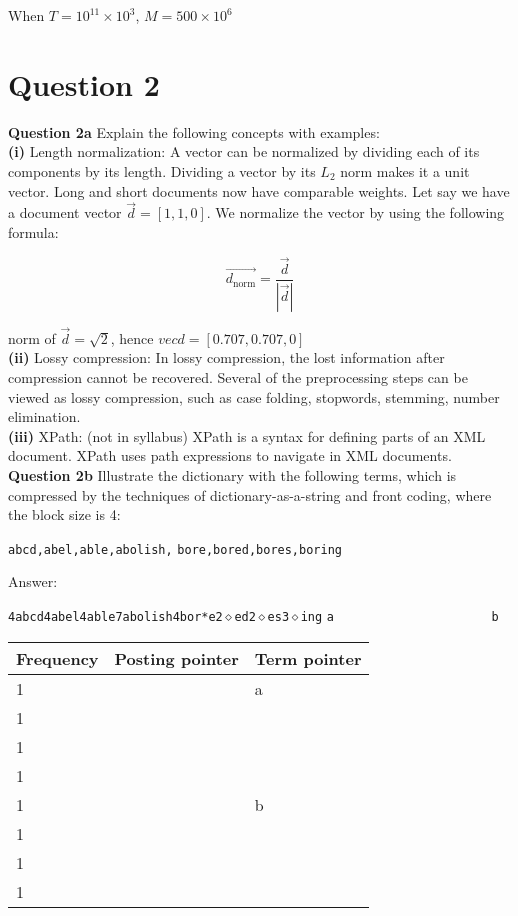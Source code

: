 \documentclass[11pt,a4paper]{report}
\begin{document}
\begin{multicols*}{2}
\noindent When $T=10^{11} \times 10^3$, $M=500 \times 10^6$

\section{Question 2}

\noindent \textbf{Question 2a} Explain the following concepts with examples:\\

\noindent \textbf{(i)} Length normalization: A vector can be normalized by dividing each of its components by its length. Dividing a vector by its $L_2$ norm makes it a unit vector. Long and short documents now have comparable weights. Let say we have a document vector $\vec{d} = [1,1,0]$. We normalize the vector by using the following formula:

$$\vec{d_{\text{norm}}} = \frac{\vec{d}}{|\vec{d}|}$$

\noindent norm of $\vec{d} = \sqrt{2}$, hence $vec{d} = [0.707, 0.707, 0]$ \\

\noindent \textbf{(ii)} Lossy compression: In lossy compression, the lost information after compression cannot be recovered. Several of the preprocessing steps can be viewed as lossy compression, such as case folding, stopwords, stemming, number elimination. \\

\noindent \textbf{(iii)} XPath: (not in syllabus) XPath is a syntax for defining parts of an XML document. XPath uses path expressions to navigate in XML documents. \\

\noindent \textbf{Question 2b} Illustrate the dictionary with the following terms, which is compressed by the techniques of dictionary-as-a-string and front coding, where the block size is 4:
\begin{center}
\verb|abcd,abel,able,abolish,|
\verb|bore,bored,bores,boring|
\end{center}

\noindent Answer:

\noindent \verb|4abcd4abel4able7abolish4bor*e2|$\diamond$\verb|ed2|$\diamond$\verb|es3|$\diamond$\verb|ing|
\noindent \verb|a                      b|

\begin{center}
\begin{tabular}{ | l | l | l |} 
    \hline
    Frequency & Posting pointer & Term pointer \\
    \hline
    1 & & a \\
    1 & & \\
    1 & & \\
    1 & & \\
    1 & & b \\
    1 & & \\
    1 & & \\
    1 & & \\
    \hline
\end{tabular}
\end{center}


\end{multicols*}
\end{document}
